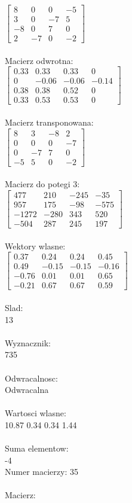\documentclass[a4paper,12pt]{article}
\begin{document}
$\begin{bmatrix} 8&0&0&-5\\3&0&-7&5\\-8&0&7&0\\2&-7&0&-2 \end{bmatrix}$
\\
\\
Macierz odwrotna:\\

$\begin{bmatrix} 0.33&0.33&0.33&0\\0&-0.06&-0.06&-0.14\\0.38&0.38&0.52&0\\0.33&0.53&0.53&0 \end{bmatrix}$
\\
\\
Macierz transponowana:\\

$\begin{bmatrix} 8&3&-8&2\\0&0&0&-7\\0&-7&7&0\\-5&5&0&-2 \end{bmatrix}$
\\
\\
Macierz do potegi 3:\\

$\begin{bmatrix} 477&210&-245&-35\\957&175&-98&-575\\-1272&-280&343&520\\-504&287&245&197 \end{bmatrix}$
\\
\\
Wektory wlasne:\\

$\begin{bmatrix} 0.37&0.24&0.24&0.45\\0.49&-0.15&-0.15&-0.16\\-0.76&0.01&0.01&0.65\\-0.21&0.67&0.67&0.59 \end{bmatrix}$
\\
\\
Slad:\\
13
\\
\\
Wyznacznik:\\
735
\\
\\
Odwracalnosc:\\
Odwracalna
\\
\\
Wartosci wlasne:\\
10.87 0.34 0.34 1.44
\\
\\
Suma elementow:\\
-4
\\
\newpage
Numer macierzy:
35
\\
\\
Macierz:\\
\end{document}
